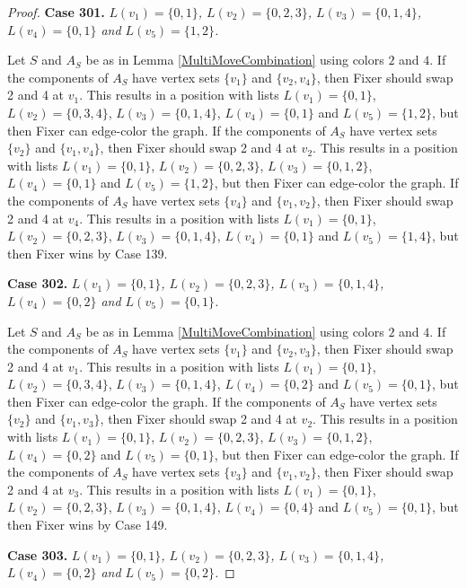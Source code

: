\documentclass[12pt]{amsart}
\theoremstyle{plain}
\theoremstyle{definition}
\theoremstyle{remark}
\begin{document}
\begin{proof}
\noindent\textbf{Case 301.  }\textit{$L(v_1) = \{0, 1\}$, $L(v_2) = \{0, 2, 3\}$, $L(v_3) = \{0, 1, 4\}$, $L(v_4) = \{0, 1\}$ and $L(v_5) = \{1, 2\}$.}

Let $S$ and $A_S$ be as in Lemma \ref{MultiMoveCombination} using colors $2$ and $4$. If the components of $A_S$ have vertex sets $\{v_1\}$ and $\{v_2, v_4\}$, then Fixer should swap 2 and 4 at $v_1$. This results in a position with lists $L(v_1) = \{0, 1\}$, $L(v_2) = \{0, 3, 4\}$, $L(v_3) = \{0, 1, 4\}$, $L(v_4) = \{0, 1\}$ and $L(v_5) = \{1, 2\}$, but then Fixer can edge-color the graph. If the components of $A_S$ have vertex sets $\{v_2\}$ and $\{v_1, v_4\}$, then Fixer should swap 2 and 4 at $v_2$. This results in a position with lists $L(v_1) = \{0, 1\}$, $L(v_2) = \{0, 2, 3\}$, $L(v_3) = \{0, 1, 2\}$, $L(v_4) = \{0, 1\}$ and $L(v_5) = \{1, 2\}$, but then Fixer can edge-color the graph. If the components of $A_S$ have vertex sets $\{v_4\}$ and $\{v_1, v_2\}$, then Fixer should swap 2 and 4 at $v_4$. This results in a position with lists $L(v_1) = \{0, 1\}$, $L(v_2) = \{0, 2, 3\}$, $L(v_3) = \{0, 1, 4\}$, $L(v_4) = \{0, 1\}$ and $L(v_5) = \{1, 4\}$, but then Fixer wins by Case 139. 

\noindent\textbf{Case 302.  }\textit{$L(v_1) = \{0, 1\}$, $L(v_2) = \{0, 2, 3\}$, $L(v_3) = \{0, 1, 4\}$, $L(v_4) = \{0, 2\}$ and $L(v_5) = \{0, 1\}$.}

Let $S$ and $A_S$ be as in Lemma \ref{MultiMoveCombination} using colors $2$ and $4$. If the components of $A_S$ have vertex sets $\{v_1\}$ and $\{v_2, v_3\}$, then Fixer should swap 2 and 4 at $v_1$. This results in a position with lists $L(v_1) = \{0, 1\}$, $L(v_2) = \{0, 3, 4\}$, $L(v_3) = \{0, 1, 4\}$, $L(v_4) = \{0, 2\}$ and $L(v_5) = \{0, 1\}$, but then Fixer can edge-color the graph. If the components of $A_S$ have vertex sets $\{v_2\}$ and $\{v_1, v_3\}$, then Fixer should swap 2 and 4 at $v_2$. This results in a position with lists $L(v_1) = \{0, 1\}$, $L(v_2) = \{0, 2, 3\}$, $L(v_3) = \{0, 1, 2\}$, $L(v_4) = \{0, 2\}$ and $L(v_5) = \{0, 1\}$, but then Fixer can edge-color the graph. If the components of $A_S$ have vertex sets $\{v_3\}$ and $\{v_1, v_2\}$, then Fixer should swap 2 and 4 at $v_3$. This results in a position with lists $L(v_1) = \{0, 1\}$, $L(v_2) = \{0, 2, 3\}$, $L(v_3) = \{0, 1, 4\}$, $L(v_4) = \{0, 4\}$ and $L(v_5) = \{0, 1\}$, but then Fixer wins by Case 149. 

\noindent\textbf{Case 303.  }\textit{$L(v_1) = \{0, 1\}$, $L(v_2) = \{0, 2, 3\}$, $L(v_3) = \{0, 1, 4\}$, $L(v_4) = \{0, 2\}$ and $L(v_5) = \{0, 2\}$.}


\end{proof}
\end{document}
